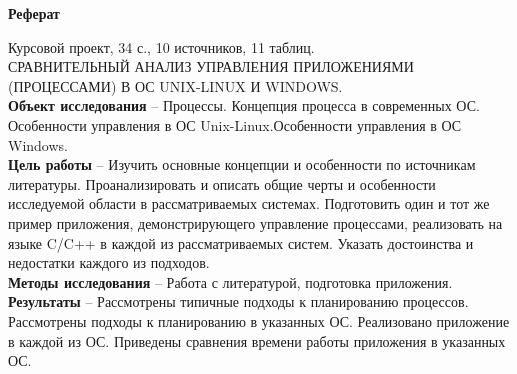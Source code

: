 \newpage

\begin{center}
\textbf{Реферат}
\end{center}

Курсовой проект, 34 с., 10 источников, 11 таблиц.\\
СРАВНИТЕЛЬНЫЙ АНАЛИЗ УПРАВЛЕНИЯ ПРИЛОЖЕНИЯМИ (ПРОЦЕССАМИ) В ОС UNIX-LINUX И WINDOWS.\\

\quad \textbf{Объект исследования} -- Процессы. Концепция процесса в современных ОС. Особенности управления в ОС Unix-Linux.Особенности управления в ОС Windows.\\

\quad \textbf{Цель работы} -- Изучить основные концепции и особенности по источникам литературы. Проанализировать и описать общие черты и особенности исследуемой области в рассматриваемых системах. Подготовить один и тот же пример приложения, демонстрирующего управление процессами, реализовать на языке C/C++ в каждой из рассматриваемых систем. Указать достоинства и недостатки каждого из подходов.\\

\quad \textbf{Методы исследования} -- Работа с литературой, подготовка приложения.\\

\quad \textbf{Результаты} -- Рассмотрены типичные подходы к планированию процессов. Рассмотрены подходы к планированию в указанных ОС. Реализовано приложение в каждой из ОС. Приведены сравнения времени работы приложения в указанных ОС.
